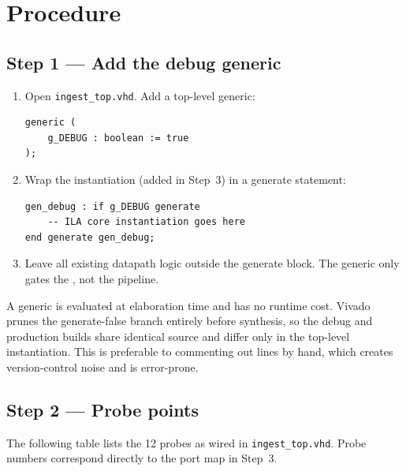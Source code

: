 \documentclass[11pt,letterpaper]{article}
\begin{document}
\section{Procedure}

\subsection{Step 1 --- Add the debug generic}
\begin{enumerate}[leftmargin=2em]
	\item Open \texttt{ingest\_top.vhd}. Add a top-level generic:
	\begin{verbatim}
generic (
    g_DEBUG : boolean := true
);
	\end{verbatim}
	\item Wrap the \ILA{} instantiation (added in Step~3) in a generate statement:
	\begin{verbatim}
gen_debug : if g_DEBUG generate
    -- ILA core instantiation goes here
end generate gen_debug;
	\end{verbatim}
	\item Leave all existing datapath logic outside the generate block. The generic only gates the \ILA{}, not the pipeline.
\end{enumerate}

\begin{tcolorbox}[infobox={Why a generic, not a \texttt{define}?}]
	A \VHDL{} generic is evaluated at elaboration time and has no runtime cost. Vivado prunes the generate-false branch entirely before synthesis, so the debug and production builds share identical \RTL{} source and differ only in the top-level instantiation. This is preferable to commenting out \ILA{} lines by hand, which creates version-control noise and is error-prone.
\end{tcolorbox}

\subsection{Step 2 --- Probe points}
The following table lists the 12 \ILA{} probes as wired in \texttt{ingest\_top.vhd}. Probe numbers correspond directly to the port map in Step~3.
\end{document}
